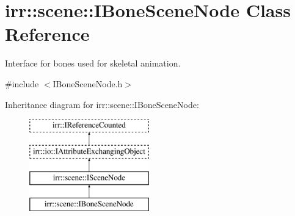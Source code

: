 \hypertarget{classirr_1_1scene_1_1IBoneSceneNode}{}\section{irr\+:\+:scene\+:\+:I\+Bone\+Scene\+Node Class Reference}
\label{classirr_1_1scene_1_1IBoneSceneNode}


Interface for bones used for skeletal animation.  




{\ttfamily \#include $<$I\+Bone\+Scene\+Node.\+h$>$}

Inheritance diagram for irr\+:\+:scene\+:\+:I\+Bone\+Scene\+Node\+:\begin{figure}[H]
\begin{center}
\leavevmode
\includegraphics[height=4.000000cm]{classirr_1_1scene_1_1IBoneSceneNode}
\end{center}
\end{figure}
